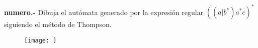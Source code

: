 \paragraph{}
\textbf{{numero}.-} Dibuja el autómata generado por la expresión regular $ ((a|b^*)a^*c)^* $ siguiendo el método de Thompson.
\begin{figure}[ht!]
\centering
\texttt{[image: ]}
\end{figure}